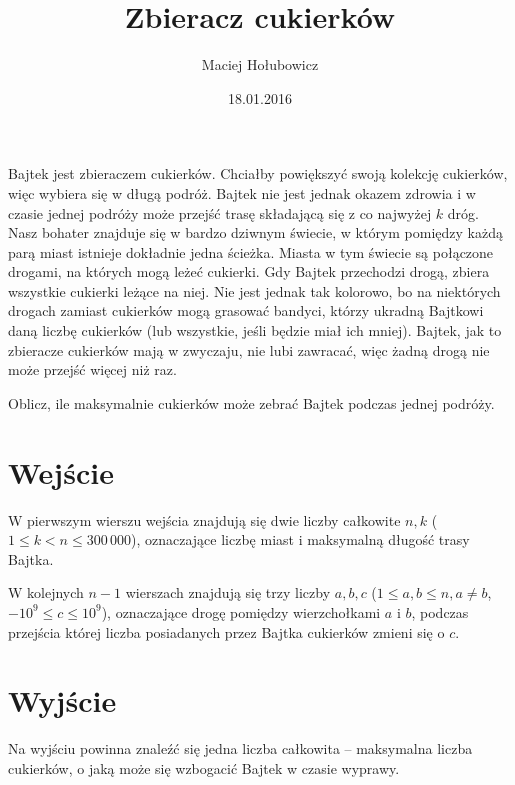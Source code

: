 \documentclass[zad,zawodnik,utf8]{sinol}
\title{Zbieracz cukierków}
\author{Maciej Hołubowicz} %
\date{18.01.2016}
\begin{document}
\begin{tasktext}%
Bajtek jest zbieraczem cukierków. Chciałby powiększyć swoją kolekcję cukierków, więc wybiera się w długą podróż. Bajtek nie jest jednak okazem zdrowia i w czasie jednej podróży może przejść trasę składającą się z co najwyżej $k$ dróg. Nasz bohater znajduje się w bardzo dziwnym świecie, w którym pomiędzy każdą parą miast istnieje dokładnie jedna ścieżka. Miasta w tym świecie są połączone drogami, na których mogą leżeć cukierki. Gdy Bajtek przechodzi drogą, zbiera wszystkie cukierki leżące na niej. Nie jest jednak tak kolorowo, bo na niektórych drogach zamiast cukierków mogą grasować bandyci, którzy ukradną Bajtkowi daną liczbę cukierków (lub wszystkie, jeśli będzie miał ich mniej). 
Bajtek, jak to zbieracze cukierków mają w zwyczaju, nie lubi zawracać, więc żadną drogą nie może przejść więcej niż raz.

Oblicz, ile maksymalnie cukierków może zebrać Bajtek podczas jednej podróży.

  \section{Wejście}
W pierwszym wierszu wejścia znajdują się dwie liczby całkowite $n, k$ ($1 \leq k < n \leq 300\,000$), oznaczające liczbę miast i maksymalną długość trasy Bajtka.

W kolejnych $n - 1$ wierszach znajdują się trzy liczby $a, b, c$ ($1 \leq a, b \leq n, a \neq b$, $-10^9 \leq c \leq 10^9$), oznaczające drogę pomiędzy wierzchołkami $a$ i $b$, podczas przejścia której liczba posiadanych przez Bajtka cukierków zmieni się o $c$.

  \section{Wyjście}
Na wyjściu powinna znaleźć się jedna liczba całkowita -- maksymalna liczba cukierków, o jaką może się wzbogacić Bajtek w czasie wyprawy.

\makecompactexample

\end{tasktext}
\end{document}
